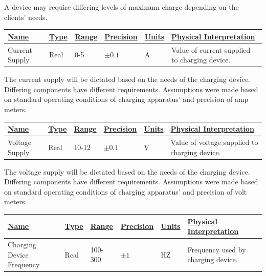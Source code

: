 \documentclass[12pt, titlepage]{article}
\begin{document}
A device may require differing levels of maximum charge depending on the clients’ needs.

\begin{center}
\begin{tabular}{|p{3cm}|p{1cm}|p{1cm}|p{2cm}|p{1cm}|p{6cm}|}
\hline
\underline{Name} & \underline{Type} & \underline{Range} & \underline{Precision} & \underline{Units} & \underline{Physical Interpretation}\\[5pt]
\hline
Current Supply & Real & 0-5 & $\pm0.1$ & A & Value of current supplied to charging device.\\
\hline
\end{tabular}
\end{center}

The current supply will be dictated based on the needs of the charging device. Differing components have different requirements. Assumptions were made based on standard operating conditions of charging apparatus’ and precision of amp meters.

\begin{center}
\begin{tabular}{|p{3cm}|p{1cm}|p{1cm}|p{2cm}|p{1cm}|p{6cm}|}
\hline
\underline{Name} & \underline{Type} & \underline{Range} & \underline{Precision} & \underline{Units} & \underline{Physical Interpretation}\\[5pt]
\hline
Voltage Supply & Real & 10-12 & $\pm0.1$ & V & Value of voltage supplied to charging device.\\
\hline
\end{tabular}
\end{center}

The voltage supply will be dictated based on the needs of the charging device. Differing components have different requirements. Assumptions were made based on standard operating conditions of charging apparatus’ and precision of volt meters.

\begin{center}
\begin{tabular}{|p{3cm}|p{1cm}|p{1cm}|p{2cm}|p{1cm}|p{6cm}|}
\hline
\underline{Name} & \underline{Type} & \underline{Range} & \underline{Precision} & \underline{Units} & \underline{Physical Interpretation}\\[5pt]
\hline
Charging Device Frequency & Real & 100-300 & $\pm1$ & HZ & Frequency used by charging device.\\
\hline
\end{tabular}
\end{center}
\end{document}
